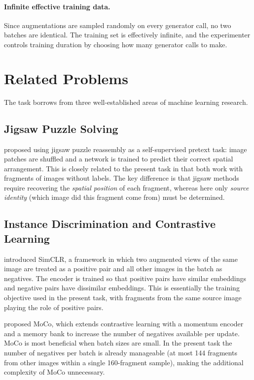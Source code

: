 \documentclass[12pt, a4paper]{article}
\begin{document}
\paragraph{Infinite effective training data.}
Since augmentations are sampled randomly on every generator call, no two batches are
identical. The training set is effectively infinite, and the experimenter controls
training duration by choosing how many generator calls to make.

\section{Related Problems}

The task borrows from three well-established areas of machine learning research.

\subsection{Jigsaw Puzzle Solving}

\textcite{noroozi2016} proposed using jigsaw puzzle reassembly as a self-supervised
pretext task: image patches are shuffled and a network is trained to predict their
correct spatial arrangement. This is closely related to the present task in that both
work with fragments of images without labels. The key difference is that jigsaw methods
require recovering the \emph{spatial position} of each fragment, whereas here only
\emph{source identity} (which image did this fragment come from) must be determined.

\subsection{Instance Discrimination and Contrastive Learning}

\textcite{simclr2020} introduced SimCLR, a framework in which two augmented views of the
same image are treated as a positive pair and all other images in the batch as negatives.
The encoder is trained so that positive pairs have similar embeddings and negative pairs
have dissimilar embeddings. This is essentially the training objective used in the present
task, with fragments from the same source image playing the role of positive pairs.

\textcite{moco2020} proposed MoCo, which extends contrastive learning with a momentum
encoder and a memory bank to increase the number of negatives available per update.
MoCo is most beneficial when batch sizes are small. In the present task the number of
negatives per batch is already manageable (at most 144 fragments from other images within
a single 160-fragment sample), making the additional complexity of MoCo unnecessary.
\end{document}

